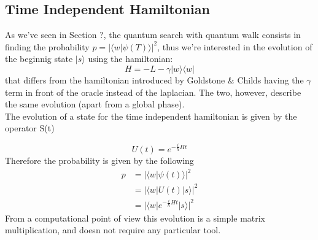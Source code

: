 \documentclass[aps,pra,reprint, onecolumn, showkeys]{revtex4-2}
\begin{document}
\subsection{Time Independent Hamiltonian}
As we've seen in Section ?, the quantum search with quantum walk consists in finding the probability $p = |\langle w|\psi(T)\rangle|^2$, thus we're interested in the evolution of the beginnig state $|s\rangle$ using the hamiltonian:
\begin{equation}
H = -L -\gamma|w\rangle\langle w|
\end{equation}
that differs from the hamiltonian introduced by Goldstone \& Childs having the $\gamma$ term in front of the oracle instead of the laplacian. The two, however, describe the same evolution (apart from a global phase). \\
The evolution of a state for the time independent hamiltonian is given by the operator S(t)

\begin{equation}
  U(t) = e^{-\frac{i}{\hbar}Ht}
\end{equation}
Therefore the probability is given by the following
\begin{equation*}
\begin{split}
  p & = |\langle w|\psi(t)\rangle|^2  \\ & = |\langle w|U(t)|s\rangle| ^2 \\& =|\langle w|e^{-\frac{i}{\hbar}Ht}|s\rangle|^2
\end{split}
\end{equation*}
From a computational point of view this evolution is a simple matrix multiplication, and doesn not require any particular tool.
\end{document}
